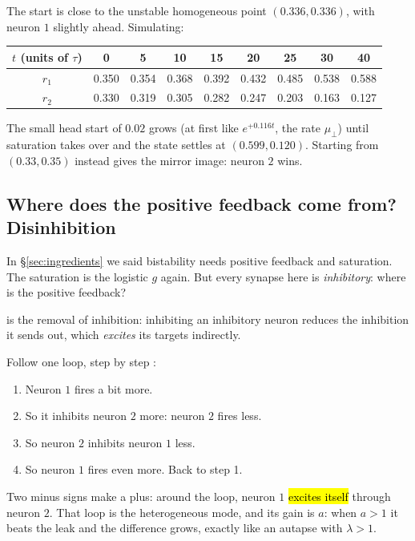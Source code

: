 \begin{example}[Watching one neuron win ($J=5$, start $r(0)=(0.35,\,0.33)$)]
The start is close to the unstable homogeneous point $(0.336,0.336)$, with neuron $1$ slightly ahead. Simulating:
\begin{center}
\renewcommand{\arraystretch}{1.2}
\begin{tabular}{c|cccccccc}
$t$ (units of $\tau$) & 0 & 5 & 10 & 15 & 20 & 25 & 30 & 40\\\hline
$r_1$ & 0.350 & 0.354 & 0.368 & 0.392 & 0.432 & 0.485 & 0.538 & 0.588\\
$r_2$ & 0.330 & 0.319 & 0.305 & 0.282 & 0.247 & 0.203 & 0.163 & 0.127\\
\end{tabular}
\end{center}
The small head start of $0.02$ grows (at first like $e^{+0.116t}$, the rate $\mu_\perp$) until saturation takes over and the state settles at $(0.599,0.120)$. Starting from $(0.33,0.35)$ instead gives the mirror image: neuron $2$ wins.
\end{example}

\subsection{Where does the positive feedback come from? Disinhibition}\label{sec:disinhibition}

In \S\ref{sec:ingredients} we said bistability needs positive feedback and saturation. The saturation is the logistic $g$ again. But every synapse here is \emph{inhibitory}: where is the positive feedback?

\begin{defn}[Disinhibition]
 is the removal of inhibition: inhibiting an inhibitory neuron reduces the inhibition it sends out, which \emph{excites} its targets indirectly.
\end{defn}

Follow one loop, step by step :
\begin{enumerate}
  \item Neuron $1$ fires a bit more.
  \item So it inhibits neuron $2$ more: neuron $2$ fires less.
  \item So neuron $2$ inhibits neuron $1$ less.
  \item So neuron $1$ fires even more. Back to step 1.
\end{enumerate}
Two minus signs make a plus: around the loop, neuron $1$ \hl{excites itself} through neuron $2$. That loop is the heterogeneous mode, and its gain is $a$: when $a>1$ it beats the leak and the difference grows, exactly like an autapse with $\lambda>1$.

